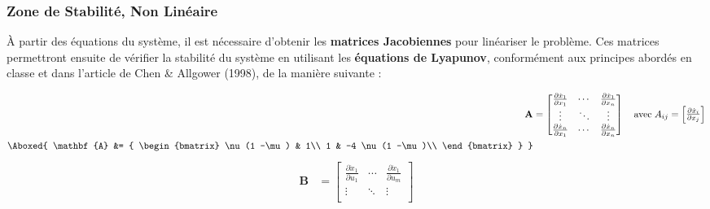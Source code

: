 \documentclass[../CSC_5RO16_TA_TP4.tex]{subfiles}
\begin{document}
\subsubsection{Zone de Stabilité, Non Linéaire}
\noindent À partir des équations du système, il est nécessaire d’obtenir les \textbf{matrices Jacobiennes} pour linéariser le problème. Ces matrices permettront ensuite de vérifier la stabilité du système en utilisant les \textbf{équations de Lyapunov}, conformément aux principes abordés en classe et dans l'article de Chen \& Allgower (1998), de la manière suivante :
\begin{multicols}{2}
    \begin{equation}
        \begin{aligned}
            \mathbf{A} &=
            \begin{bmatrix}
                \frac{\partial \dot{x}_{1}}{\partial x_{1}} & \cdots & \frac{\partial \dot{x}_{1}}{\partial x_{n}}\\
                \vdots & \ddots & \vdots\\
                \frac{\partial \dot{x}_{n}}{\partial x_{1}} & \cdots & \frac{\partial \dot{x}_{n}}{\partial x_{n}}\\
            \end{bmatrix}
            \quad\text{avec}\;
            A_{ij} =
            \begin{bmatrix}
                \frac{\partial \dot{x}_{i}}{\partial x_{j}}
            \end{bmatrix}\\
            \Aboxed{
                \mathbf{A} &= 
                {
                    \begin{bmatrix}
                        \nu (1 -\mu) & 1\\
                        1 & -4 \nu (1 -\mu)\\
                    \end{bmatrix}
                }
            }
        \end{aligned}
    \end{equation}
    \break
    \begin{equation}
        \begin{aligned}
            \mathbf{B} &=
            \begin{bmatrix}
                \frac{\partial \dot{x}_{1}}{\partial u_{1}} & \cdots & \frac{\partial \dot{x}_{1}}{\partial u_{m}}\\
                \vdots & \ddots & \vdots\\

\end{bmatrix}
\end{aligned}
\end{equation}
\end{multicols}
\end{document}
